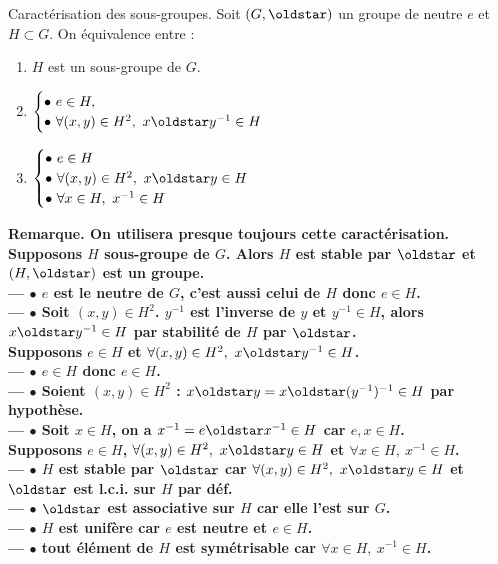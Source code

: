 \documentclass[11pt]{article}
\begin{document}
\begin{thm}{Caractérisation des sous-groupes.}{}
    Soit $(G,\s)$ un groupe de neutre $e$ et $H\subset G$. On équivalence entre :
    \begin{enumerate}
        \item $H$ est un sous-groupe de $G$.
        \item $
            \begin{cases}
                \bullet ~ e \in H,\\
                \bullet ~ \forall (x,y) \in H^2, ~ x \s y^{-1} \in H
            \end{cases}$
        \item $
            \begin{cases}
                \bullet ~ e \in H\\
                \bullet ~ \forall (x,y) \in H^2, ~ x \s y \in H\\
                \bullet ~ \forall x \in H, ~ x^{-1} \in H
            \end{cases}$
    \end{enumerate}
    \bf{Remarque.} On utilisera presque \bf{toujours} cette caractérisation. 
    \tcblower
     Supposons $H$ sous-groupe de $G$. Alors $H$ est stable par $\s$ et $(H,\s)$ est un groupe.\\
    --- $\bullet$ $e$ est le neutre de $G$, c'est aussi celui de $H$ donc $e\in H$.\\
    --- $\bullet$ Soit $(x,y)\in H^2$. $y^{-1}$ est l'inverse de $y$ et $y^{-1}\in H$, alors $x\s y^{-1}\in H$ par stabilité de $H$ par $\s$.\\
     Supposons $e\in H$ et $\forall (x,y) \in H^2, ~ x \s y^{-1} \in H$.\\
    --- $\bullet$ $e\in H$ donc $e\in H$.\\
    --- $\bullet$ Soient $(x,y)\in H^2$ : $x\s y= x\s(y^{-1})^{-1}\in H$ par hypothèse.\\
    --- $\bullet$ Soit $x\in H$, on a $x^{-1}=e\s x^{-1}\in H$ car $e,x\in H$.\\
     Supposons $e\in H$, $\forall (x,y)\in H^2, ~ x\s y\in H$ et $\forall x \in H, ~ x^{-1} \in H$.\\
    --- $\bullet$ $H$ est stable par $\s$ car $\forall (x,y)\in H^2, ~ x\s y\in H$ et $\s$ est l.c.i. sur $H$ par déf.\\
    --- $\bullet$ $\s$ est associative sur $H$ car elle l'est sur $G$.\\
    --- $\bullet$ $H$ est unifère car $e$ est neutre et $e\in H$.\\
    --- $\bullet$ tout élément de $H$ est symétrisable car $\forall x \in H, ~ x^{-1} \in H$.
\end{thm}
\end{document}
